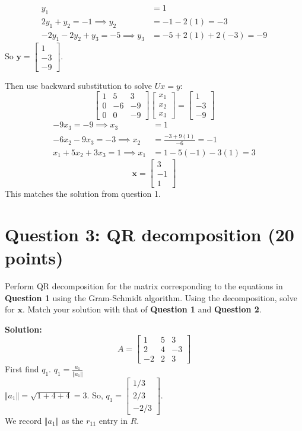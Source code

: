 \documentclass[11pt]{article}
\begin{document}
\begin{align*}
y_1 &= 1\\
2y_1 + y_2 = -1 \implies y_2 &= -1-2(1) = -3\\
-2y_1 - 2y_2 + y_3 = -5 \implies y_3 &= -5 + 2(1) + 2(-3) = -9
\end{align*}
So $\mathbf{y}=\begin{bmatrix} 1\\-3\\-9 \end{bmatrix}$.

\bigskip
Then use backward substitution to solve $Ux=y$:
$$
\begin{bmatrix}
    1&5&3\\
    0&-6&-9\\
    0&0&-9
\end{bmatrix}
\begin{bmatrix} x_1\\x_2\\x_3 \end{bmatrix}
=\begin{bmatrix} 1\\-3\\-9 \end{bmatrix}
$$
\begin{align*}
-9x_3 = -9 \implies x_3 &= 1\\
-6x_2 - 9x_3 = -3 \implies x_2 &= \frac{-3+9(1)}{-6} = -1\\
x_1 + 5x_2 + 3x_3 = 1 \implies x_1 &= 1 - 5(-1) - 3(1) = 3
\end{align*}
$$
\mathbf{x}=\begin{bmatrix} 3\\-1\\1 \end{bmatrix}
$$
This matches the solution from question 1.

\bigskip

\newpage
\section*{Question 3: QR decomposition (20 points)}

Perform QR decomposition for the matrix corresponding to the equations in \textbf{Question 1} using the Gram-Schmidt algorithm. Using the decomposition, solve for $\mathbf{x}$. Match your solution with that of \textbf{Question 1} and \textbf{Question 2}.

\textbf{Solution:}
$$
A=\begin{bmatrix}
    1&5&3\\
    2&4&-3\\
    -2&2&3
\end{bmatrix}
$$
First find $q_1$. \quad $q_1 = \frac{a_1}{\Vert a_1 \Vert}$\\
$\Vert a_1 \Vert = \sqrt{1 + 4 + 4} = 3$. So, $q_1 = \begin{bmatrix}
    1/3\\2/3\\-2/3
\end{bmatrix}$.\\
We record $\Vert a_1 \Vert$ as the $r_{11}$ entry in $R$.\\
\medskip
\end{document}
